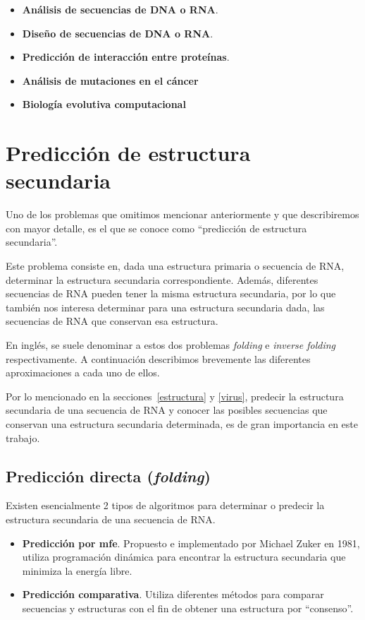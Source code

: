 \begin{itemize}
 \item \textbf{An\'alisis de secuencias de \ac{DNA} o \ac{RNA}}.
 \item \textbf{Dise\~no de secuencias de \ac{DNA} o \ac{RNA}}.
 \item \textbf{Predicci\'on de interacci\'on entre prote\'inas}.
 \item \textbf{An\'alisis de mutaciones en el c\'ancer}
 \item \textbf{Biolog\'ia evolutiva computacional}
\end{itemize}

\section{Predicci\'on de estructura secundaria}

Uno de los problemas que omitimos mencionar anteriormente y que describiremos
con mayor detalle, es el que se conoce como ``predicci\'on de estructura
secundaria''. 

Este problema consiste en, dada una estructura primaria o secuencia de \ac{RNA},
determinar la estructura secundaria correspondiente. Adem\'as, diferentes
secuencias de \ac{RNA} pueden tener la misma estructura secundaria, por lo que
tambi\'en nos interesa determinar para una estructura secundaria dada, las
secuencias de \ac{RNA} que conservan esa estructura. 

En ingl\'es, se suele denominar a estos dos problemas \textit{folding} e
\textit{inverse folding} respectivamente. A continuaci\'on describimos
brevemente las diferentes aproximaciones a cada uno de ellos.

Por lo mencionado en la secciones~\ref{estructura} y \ref{virus}, predecir la
estructura secundaria de una secuencia de \ac{RNA} y conocer las posibles
secuencias que conservan una estructura secundaria determinada, es de gran
importancia en este trabajo.

\subsection{Predicci\'on directa (\textit{folding})}
\label{folding}
Existen esencialmente 2 tipos de algoritmos para determinar o predecir la
estructura secundaria de una secuencia de \ac{RNA}.

\begin{itemize} 
 \item \textbf{Predicci\'on por \ac{mfe}}. Propuesto e implementado por Michael
Zuker en 1981\cite{Zuker81}, utiliza programaci\'on din\'amica para encontrar la
estructura secundaria que minimiza la energ\'ia libre.
 \item \textbf{Predicci\'on comparativa}. Utiliza diferentes m\'etodos para
comparar secuencias y estructuras con el fin de obtener una estructura por
``consenso''\cite{Gardner04}.
\end{itemize}

